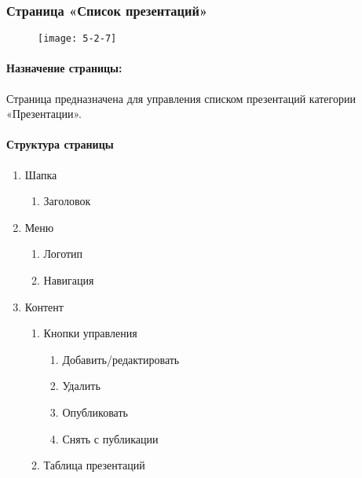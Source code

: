 \subsubsection{Страница «Список презентаций»}
\begin{figure}[H]
	\texttt{[image: 5-2-7]}
\end{figure}
\paragraph{Назначение страницы:} Страница предназначена для управления списком презентаций категории «Презентации».

\paragraph{Структура страницы}
\begin{enumerate}
	\item Шапка
	\begin{enumerate}
		\item Заголовок
	\end{enumerate}

	\item Меню
	\begin{enumerate}
		\item Логотип
		\item Навигация
	\end{enumerate}

	\item Контент
	\begin{enumerate}
		\item Кнопки управления
		\begin{enumerate}
			\item Добавить/редактировать
			\item Удалить
			\item Опубликовать
			\item Снять с публикации
		\end{enumerate}
		\item Таблица презентаций
	\end{enumerate}
\end{enumerate}


